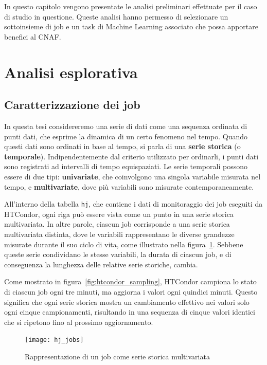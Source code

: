 \label{chap:analisi}

In questo capitolo vengono presentate le analisi preliminari effettuate per il
caso di studio in questione. Queste analisi hanno permesso di selezionare un
sottoinsieme di job e un task di Machine Learning associato che possa
apportare benefici al CNAF.

\section{Analisi esplorativa}

\subsection{Caratterizzazione dei job}
\label{sec:job_analysis}
In questa tesi considereremo una serie di dati come una sequenza ordinata di
punti dati, che esprime la dinamica di un certo fenomeno nel tempo. Quando
questi dati sono ordinati in base al tempo, si parla di una \textbf{serie
storica} (o \textbf{temporale}).
Indipendentemente dal criterio utilizzato per ordinarli, i punti dati sono
registrati ad intervalli di tempo equispaziati. Le serie temporali possono
essere di due tipi: \textbf{univariate}, che coinvolgono una singola variabile
misurata nel tempo, e \textbf{multivariate}, dove più variabili sono misurate
contemporaneamente.

All'interno della tabella \texttt{hj}, che contiene i dati di monitoraggio dei
job eseguiti da HTCondor, ogni riga può essere vista come un punto in una
serie storica multivariata. In altre parole, ciascun job corrisponde a una
serie storica multivariata distinta, dove le variabili rappresentano le
diverse grandezze misurate durante il suo ciclo di vita, come illustrato nella
figura~\ref{fig:job_time_series}. Sebbene queste serie condividano le stesse
variabili, la durata di ciascun job, e di conseguenza la lunghezza delle
relative serie storiche, cambia.

Come mostrato in figura~\ref{fig:htcondor_sampling}, HTCondor campiona lo
stato di ciascun job ogni tre minuti, ma aggiorna i valori ogni quindici
minuti. Questo significa che ogni serie storica mostra un cambiamento
effettivo nei valori solo ogni cinque campionamenti, risultando in una
sequenza di cinque valori identici che si ripetono fino al prossimo
aggiornamento.

\begin{figure}[p]
    \centering 
    \texttt{[image: hj\_jobs]}
    \caption{\small Rappresentazione di un job come serie storica multivariata}
    \label{fig:job_time_series}
\end{figure}

